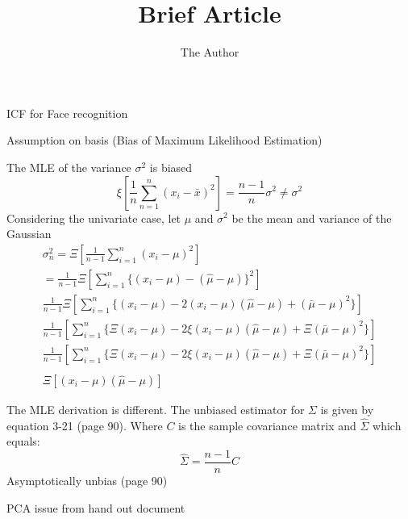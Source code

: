 \documentclass[11pt]{article}
\title{Brief Article}
\author{The Author}
\begin{document}
\maketitle

ICF for Face recognition

Assumption on basis (Bias of Maximum Likelihood Estimation)

The MLE of the variance $\sigma^2$ is biased 
\begin{equation}
\xi [\frac{1}{n} \sum_{n=1}^n ( x_i - \bar{x})^2] = \frac{n-1}{n}\sigma^2 \neq \sigma^2
\end{equation}
Considering the univariate case, let $\mu$ and $\sigma^2$ be the mean and variance of the Gaussian 
\begin{eqnarray}
\sigma^2 _n = \Xi [\frac{1}{n-1} \sum _{i=1}^n (x_i - \mu)^2] \\
 = \frac{1}{n-1} \Xi [ \sum_{i=1}^n \{(x_i - \mu) - (\hat{\mu} - \mu)  \}^2] \\
\frac{1}{n-1} \Xi [ \sum_{i=1}^n \{(x_i - \mu) -2 (x_i - \mu) (\hat{\mu} - \mu) + (\bar{\mu} - \mu)^2  \}]  \\
 \frac{1}{n-1}[ \sum_{i=1}^n \{\Xi(x_i - \mu) -2 \xi(x_i - \mu) (\hat{\mu} - \mu) + \Xi(\bar{\mu} - \mu)^2  \}] \\
 \frac{1}{n-1}[ \sum_{i=1}^n \{\Xi(x_i - \mu) -2 \xi(x_i - \mu) (\hat{\mu} - \mu) + \Xi(\bar{\mu} - \mu)^2  \}] \\
\\
\Xi [(x_i - \mu)(\hat{\mu} - \mu)]
\end{eqnarray}



The MLE derivation is different.  The unbiased estimator for $\Sigma$ is given by equation 3-21 (page 90).  Where $C$ is the sample covariance matrix and $\hat{\Sigma}$ which equals:
\[
\hat{\Sigma} = \frac{n-1}{n}C 
\]
Asymptotically unbias  (page 90)


PCA issue from hand out document  
\end{document}
